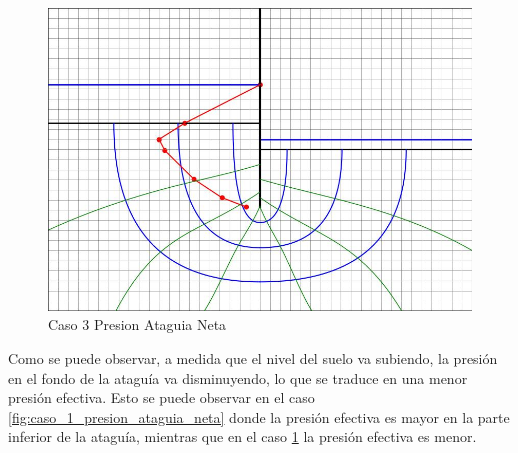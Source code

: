 \begin{figure}[H]
\begin{minipage}{0.32\textwidth}
        \centering
        \includegraphics[width=\textwidth]{GRAFICOS/caso_3_presion_ataguia_neta.jpg}
        \caption{Caso 3 Presion Ataguia Neta}
        \label{fig:caso_3_presion_ataguia_neta}
    \end{minipage}
\end{figure}

Como se puede observar, a medida que el nivel del suelo va subiendo, la presión en el fondo de la ataguía va disminuyendo, lo que se traduce en una menor presión efectiva. Esto se puede observar en el caso \ref{fig:caso_1_presion_ataguia_neta} donde la presión efectiva es mayor en la parte inferior de la ataguía, mientras que en el caso \ref{fig:caso_3_presion_ataguia_neta} la presión efectiva es menor.

